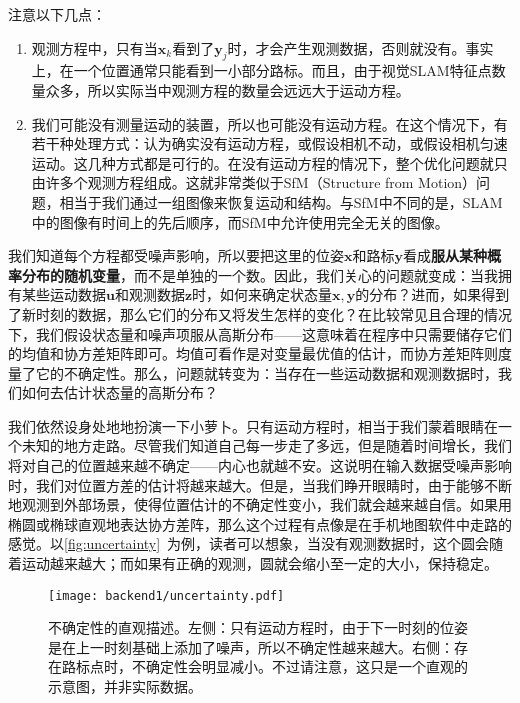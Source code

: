 注意以下几点：

\begin{enumerate}
	\item 观测方程中，只有当$\bm{x}_k$看到了$\bm{y}_j$时，才会产生观测数据，否则就没有。事实上，在一个位置通常只能看到一小部分路标。而且，由于视觉SLAM特征点数量众多，所以实际当中观测方程的数量会远远大于运动方程。
	\item 我们可能没有测量运动的装置，所以也可能没有运动方程。在这个情况下，有若干种处理方式：认为确实没有运动方程，或假设相机不动，或假设相机匀速运动。这几种方式都是可行的。在没有运动方程的情况下，整个优化问题就只由许多个观测方程组成。这就非常类似于SfM（Structure from Motion）问题，相当于我们通过一组图像来恢复运动和结构。与SfM中不同的是，SLAM中的图像有时间上的先后顺序，而SfM中允许使用完全无关的图像。
\end{enumerate}

我们知道每个方程都受噪声影响，所以要把这里的位姿$\bm{x}$和路标$\bm{y}$看成\textbf{服从某种概率分布的随机变量}，而不是单独的一个数。因此，我们关心的问题就变成：当我拥有某些运动数据$\bm{u}$和观测数据$\bm{z}$时，如何来确定状态量$\bm{x}, \bm{y}$的分布？进而，如果得到了新时刻的数据，那么它们的分布又将发生怎样的变化？在比较常见且合理的情况下，我们假设状态量和噪声项服从高斯分布——这意味着在程序中只需要储存它们的均值和协方差矩阵即可。均值可看作是对变量最优值的估计，而协方差矩阵则度量了它的不确定性。那么，问题就转变为：当存在一些运动数据和观测数据时，我们如何去估计状态量的高斯分布？

我们依然设身处地地扮演一下小萝卜。只有运动方程时，相当于我们蒙着眼睛在一个未知的地方走路。尽管我们知道自己每一步走了多远，但是随着时间增长，我们将对自己的位置越来越不确定——内心也就越不安。这说明在输入数据受噪声影响时，我们对位置方差的估计将越来越大。但是，当我们睁开眼睛时，由于能够不断地观测到外部场景，使得位置估计的不确定性变小，我们就会越来越自信。如果用椭圆或椭球直观地表达协方差阵，那么这个过程有点像是在手机地图软件中走路的感觉。以\autoref{fig:uncertainty}~为例，读者可以想象，当没有观测数据时，这个圆会随着运动越来越大；而如果有正确的观测，圆就会缩小至一定的大小，保持稳定。

\begin{figure}[!ht]
	\centering
	\texttt{[image: backend1/uncertainty.pdf]}
	\caption{不确定性的直观描述。左侧：只有运动方程时，由于下一时刻的位姿是在上一时刻基础上添加了噪声，所以不确定性越来越大。右侧：存在路标点时，不确定性会明显减小。不过请注意，这只是一个直观的示意图，并非实际数据。}
	\label{fig:uncertainty}
\end{figure}

